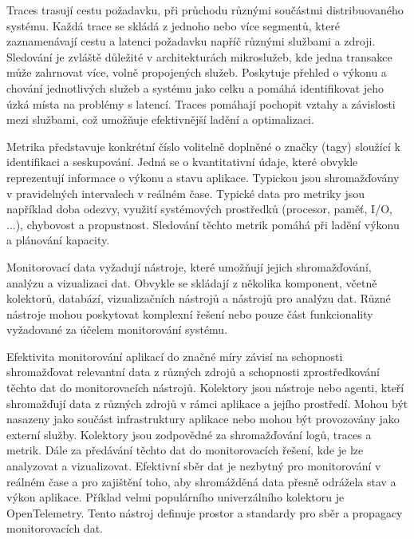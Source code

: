 
Traces trasují cestu požadavku, při průchodu různými součástmi distribuovaného systému. Každá trace se skládá z jednoho nebo více segmentů, které zaznamenávají cestu a latenci požadavku napříč různými službami a zdroji. Sledování je zvláště důležité v architekturách mikroslužeb, kde jedna transakce může zahrnovat více, volně propojených služeb. Poskytuje přehled o výkonu a chování jednotlivých služeb a systému jako celku a pomáhá identifikovat jeho úzká místa na problémy s latencí. Traces pomáhají pochopit vztahy a závislosti mezi službami, což umožňuje efektivnější ladění a optimalizaci. \cite{Molkova2023}


Metrika představuje konkrétní číslo volitelně doplněné o značky (tagy) sloužící k identifikaci a seskupování. \cite{Majors2022} Jedná se o kvantitativní údaje, které obvykle reprezentují informace o výkonu a stavu aplikace. Typickou jsou shromažďovány v pravidelných intervalech v reálném čase. Typické data pro metriky jsou například doba odezvy, využití systémových prostředků (procesor, paměť, I/O, ...), chybovost a propustnost. Sledování těchto metrik pomáhá při ladění výkonu a plánování kapacity.


Monitorovací data vyžadují nástroje, které umožňují jejich shromažďování, analýzu a vizualizaci dat. Obvykle se skládají z několika komponent, včetně kolektorů, databází, vizualizačních nástrojů a nástrojů pro analýzu dat. Různé nástroje mohou poskytovat komplexní řešení nebo pouze část funkcionality vyžadované za účelem monitorování systému. \cite{Riedesel2021}


Efektivita monitorování aplikací do značné míry závisí na schopnosti shromažďovat relevantní data z různých zdrojů a schopnosti zprostředkování těchto dat do monitorovacích nástrojů. Kolektory jsou nástroje nebo agenti, kteří shromažďují data z různých zdrojů v rámci aplikace a jejího prostředí. Mohou být nasazeny jako součást infrastruktury aplikace nebo mohou být provozovány jako externí služby. Kolektory jsou zodpovědné za shromažďování logů, traces a metrik. Dále za předávání těchto dat do monitorovacích řešení, kde je lze analyzovat a vizualizovat. Efektivní sběr dat je nezbytný pro monitorování v reálném čase a pro zajištění toho, aby shromážděná data přesně odrážela stav a výkon aplikace. Příklad velmi populárního univerzálního kolektoru je OpenTelemetry. Tento nástroj definuje prostor a standardy pro sběr a propagacy monitorovacích dat. \cite{Blanco2023}

